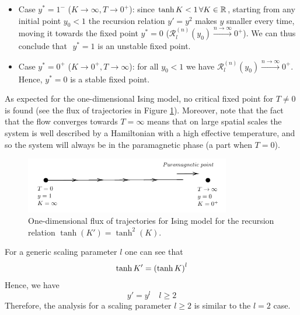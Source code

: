 \documentclass[../../Main/Main.tex]{subfiles}
\begin{document}
\begin{itemize}
\item Case \( y^*=1^- \) (\( K \rightarrow \infty , T \rightarrow 0^+ \)): since \( \tanh K < 1 \, \forall K \in \mathbb{R} \), starting from any initial point \( y_0 <1 \) the recursion relation \( y' = y^2 \) makes \( y \) smaller every time,  moving it towards the fixed point \( y^* = 0 \) (\( \mathcal{R}_l^{(n)} (y_0) \overset{n \rightarrow \infty }{\rightarrow } 0^+ \)). We can thus conclude that \(  \)  \( y^* =1 \) is an unstable fixed point.

\item Case \( y^*=0^+ \) (\( K \rightarrow 0^+ , T \rightarrow \infty  \)): for all \( y_0 <1 \) we have \( \mathcal{R}_l^{(n)} (y_0) \overset{n \rightarrow \infty }{\rightarrow } 0^+ \). Hence,  \( y^* =0 \) is a stable fixed point.

\end{itemize}

As expected for the one-dimensional Ising model, no critical fixed point for \( T \neq 0\) is found (see the flux of trajectories in Figure \ref{fig:20_5}).
Moreover, note that the fact that the flow converges towards \( T = \infty  \) means that on large spatial scales the system is well described by a Hamiltonian with a high effective temperature, and so the system will always be in the paramagnetic phase (a part when \( T=0 \)).

\begin{figure}[H]
\centering
\includegraphics[width=0.8\textwidth]{./img/5.pdf}
\caption{\label{fig:20_5} One-dimensional flux of trajectories for Ising model for the recursion relation \( \tanh(K') = \tanh^2 (K) \). }
\end{figure}

\begin{remark}
For a generic scaling parameter \( l \) one can see that
\begin{equation*}
  \tanh K' = \qty( \tanh K )^l
\end{equation*}
Hence, we have
\begin{equation*}
  y' = y^l \quad l \ge 2
\end{equation*}
Therefore, the analysis for a scaling parameter \( l \ge 2 \) is similar to the \( l=2 \) case.
\end{remark}
\end{document}

